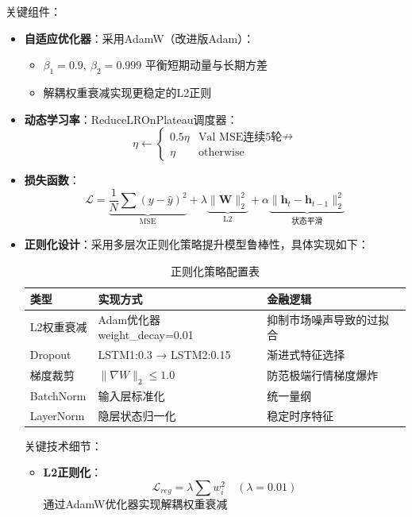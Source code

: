 \documentclass[a4paper,12pt]{ctexart}
\begin{document}
关键组件：
\begin{itemize}
\item \textbf{自适应优化器}：采用AdamW（改进版Adam）：
  \begin{itemize}
  \item $\beta_1=0.9,\ \beta_2=0.999$ 平衡短期动量与长期方差
  \item 解耦权重衰减实现更稳定的L2正则
  \end{itemize}
  
\item \textbf{动态学习率}：ReduceLROnPlateau调度器：
  \[
  \eta \leftarrow \begin{cases}
  0.5\eta & \text{Val MSE连续5轮$\nrightarrow$} \\
  \eta & \text{otherwise}
  \end{cases}
  \]
  
\item \textbf{损失函数}：
  \[
  \mathcal{L} = \underbrace{\frac{1}{N}\sum(y-\hat{y})^2}_{\text{MSE}} + \lambda \underbrace{\|\mathbf{W}\|_2^2}_{\text{L2}} + \alpha \underbrace{\|\mathbf{h}_t-\mathbf{h}_{t-1}\|_2^2}_{\text{状态平滑}}
  \]

\item \textbf{正则化设计}：采用多层次正则化策略提升模型鲁棒性，具体实现如下：

\begin{center}
\begin{table}[h]
\centering
\begin{tabular}{lll}
\toprule
\textbf{类型} & \textbf{实现方式} & \textbf{金融逻辑} \\
\midrule
L2权重衰减 & Adam优化器weight\_decay=0.01 & 抑制市场噪声导致的过拟合 \\
Dropout & LSTM1:0.3 → LSTM2:0.15 & 渐进式特征选择 \\
梯度裁剪 & $\|\nabla W\|_2 \leq 1.0$ & 防范极端行情梯度爆炸 \\
BatchNorm & 输入层标准化 & 统一量纲 \\
LayerNorm & 隐层状态归一化 & 稳定时序特征 \\
\bottomrule
\end{tabular}
\caption{正则化策略配置表}
\end{table}
\end{center}

关键技术细节：
\begin{itemize}
\item \textbf{L2正则化}：
  \[
  \mathcal{L}_{reg} = \lambda\sum w_i^2 \quad (\lambda=0.01)
  \]
  通过AdamW优化器实现解耦权重衰减
  

\end{itemize}
\end{itemize}
\end{document}
